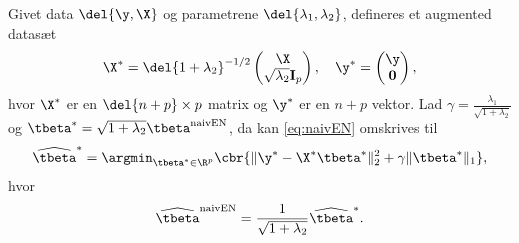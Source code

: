 %
\begin{lem} \label{lem:elastisk_net}
Givet data \(\del{\y, \X}\) og parametrene \(\del{\lambda_1, \lambda_2}\), defineres et augmented datasæt 
\begin{align*}
\X^* = \del{1 + \lambda_2}^{-1/2} \begin{pmatrix}
\X \\ \sqrt{\lambda_2} \mathbf{I}_p
\end{pmatrix}, \quad \y^* = \begin{pmatrix}
\y \\ \mathbf{0}
\end{pmatrix},
\end{align*}
hvor \(\X^*\) er en \(\del{n+p} \times p\) matrix og \(\y^*\) er en \(n + p\) vektor. 
Lad \(\gamma = \frac{\lambda_1}{\sqrt{1+\lambda_2}}\) og \(\tbeta^* = \sqrt{1+\lambda_2} \tbeta^\text{naivEN}\), da kan \eqref{eq:naivEN} omskrives til
\begin{align}
\widehat{\tbeta}^* = \argmin_{\tbeta^* \in \R^p} \cbr{ \Vert \y^* - \X^* \tbeta^* \Vert_2^2 +\gamma \Vert \tbeta^* \Vert_1}, \label{eq:EN11}
\end{align}
hvor
\begin{align*}
\widehat{\tbeta}^\text{naivEN} = \frac{1}{\sqrt{1+\lambda_2}} \widehat{\tbeta}^*.
\end{align*}
\end{lem}
%
